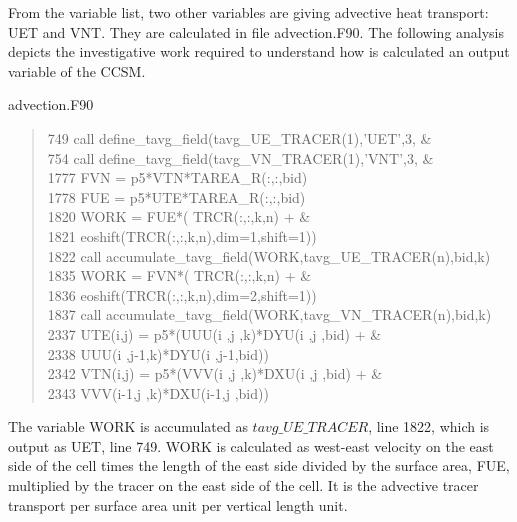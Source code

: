 \begin{appendices}
From the variable list, two other variables are giving advective heat transport: UET and VNT. They are calculated in file advection.F90. The following analysis depicts the investigative work required to understand how is calculated an output variable of the CCSM. 
\begin{center} advection.F90 \end{center}
\begin{quotation}
\small
\linespread{0.5}\selectfont\noindent
\phantom{1}749 \hspace{1em}  call define\_tavg\_field(tavg\_UE\_TRACER(1),'UET',3,     \&\\
\phantom{1}754 \hspace{1em} call define\_tavg\_field(tavg\_VN\_TRACER(1),'VNT',3,                   \&\\
1777 \hspace{1em}         FVN =  p5*VTN*TAREA\_R(:,:,bid)\\
1778  \hspace{1em}        FUE =  p5*UTE*TAREA\_R(:,:,bid)\\
1820  \hspace{1em}             WORK = FUE*(        TRCR(:,:,k,n) + \&\\
1821  \hspace{1em}                         eoshift(TRCR(:,:,k,n),dim=1,shift=1))\\
1822  \hspace{1em}             call accumulate\_tavg\_field(WORK,tavg\_UE\_TRACER(n),bid,k)\\
1835  \hspace{1em}            WORK = FVN*(        TRCR(:,:,k,n) + \&\\
1836  \hspace{1em}                         eoshift(TRCR(:,:,k,n),dim=2,shift=1))\\
1837  \hspace{1em}             call accumulate\_tavg\_field(WORK,tavg\_VN\_TRACER(n),bid,k)\\
2337  \hspace{1em}        UTE(i,j) = p5*(UUU(i  ,j  ,k)*DYU(i  ,j  ,bid) + \&\\
2338  \hspace{1em}                       UUU(i  ,j-1,k)*DYU(i  ,j-1,bid))\\
2342  \hspace{1em}        VTN(i,j) = p5*(VVV(i  ,j  ,k)*DXU(i  ,j  ,bid) + \&\\
2343  \hspace{1em}                       VVV(i-1,j  ,k)*DXU(i-1,j  ,bid))\\
\end{quotation}
The variable WORK is accumulated as $tavg\_UE\_TRACER$, line 1822, which is output as UET, line 749. WORK is calculated as west-east velocity on the east side of the cell times the length of the east side divided by the surface area, FUE, multiplied by the tracer on the east side of the cell. It is the advective tracer transport per surface area unit per vertical length unit.


\end{appendices}
